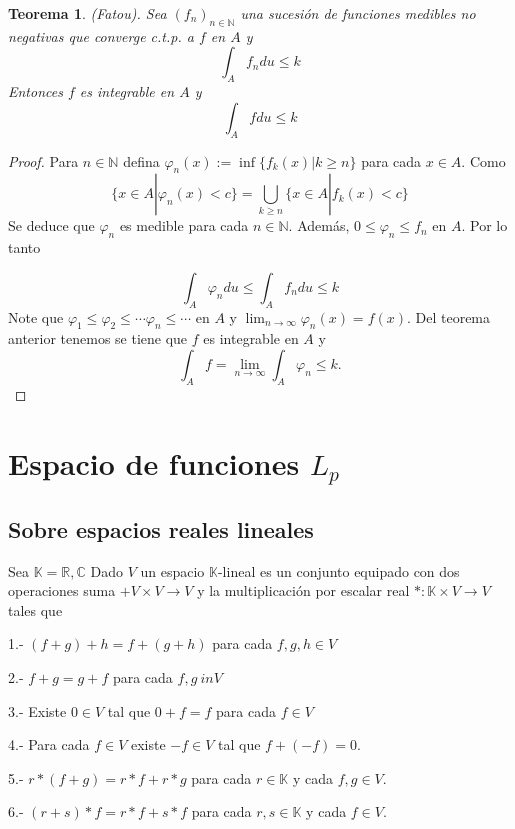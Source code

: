 \documentclass[twoside,12pt,a4 paper,openright]{book}
\newtheorem{teo}[claim]{Teorema}
\begin{document}
\begin{teo}
    (Fatou). Sea $(f_n)_{n\in\mathbb N} $ una sucesi\'on de funciones medibles no negativas que converge c.t.p. a $f$ en $A$ y 
    $$\int_A f_n du \leq k$$
    Entonces $f$ es integrable en $A$ y 
    $$\int_A  f du \leq k$$
\end{teo}
\begin{proof}
    Para $n\in \mathbb N$ defina $\varphi_n(x) := \inf \{f_k(x) | k\geq n\}$ para cada  $x\in A$. Como 
    $$\{x\in A | \varphi_n(x)< c\} = \bigcup_{k\geq n }\{x\in A| f_k(x)< c\}$$
    Se deduce que $\varphi_n$ es medible para cada $n\in \mathbb N$. Adem\'as, $0\leq \varphi_n\leq f_n$
    en $A$. Por lo tanto 

    $$\int_A \varphi_n du \leq \int_A f_n du \leq k$$
    Note que $\varphi_1\leq \varphi_2\leq \cdots\varphi_n \leq \cdots$ en $A$ y 
    $\displaystyle\lim_{n\to \infty}\varphi_n(x) = f(x)$. Del teorema anterior tenemos  se tiene que    $f$ es integrable en $A$ y 
   $$ \int_A f=\lim_{n\to\infty} \int_A \varphi_n \leq k.$$
    

\end{proof}


\chapter{Espacio de funciones $L_p$ } 



 
 
\section{Sobre espacios reales lineales} 

Sea $\mathbb K= \mathbb R,\mathbb C$
Dado $V$  un espacio $\mathbb K$-lineal es un conjunto equipado con dos operaciones suma $+ V\times V \to V$ y la multiplicaci\'on por escalar real $*: \mathbb K \times V\to V$ tales que

1.- $(f+g)+h= f+ (g+h)$ para cada $f,g,h\in V$

2.- $f+g= g+f$ para cada $f,g\ in V$

3.- Existe $0\in V$ tal que $0+f=f$ para cada $f\in V$

4.- Para cada $f\in V$ existe $-f\in V$ tal que $f+(-f) =0$.

5.- $r*(f+g)= r*f+r*g$ para cada $r\in \mathbb K$ y cada $f,g\in V$.

6.- $(r+s)* f = r*f+s*f$ para cada $r,s\in \mathbb K$ y cada $f\in V$.
\end{document}
